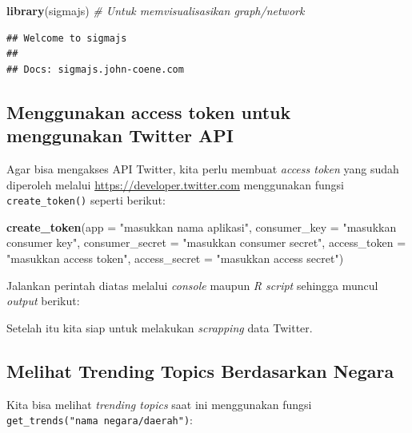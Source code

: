 \documentclass[]{tufte-handout}
\newenvironment{Shaded}{}{}
\newcommand{\KeywordTok}[1]{\textcolor[rgb]{0.00,0.44,0.13}{\textbf{#1}}}
\newcommand{\DataTypeTok}[1]{\textcolor[rgb]{0.56,0.13,0.00}{#1}}
\newcommand{\StringTok}[1]{\textcolor[rgb]{0.25,0.44,0.63}{#1}}
\newcommand{\CommentTok}[1]{\textcolor[rgb]{0.38,0.63,0.69}{\textit{#1}}}
\newcommand{\NormalTok}[1]{#1}
\begin{document}
\begin{Shaded}
\begin{Highlighting}[]
\KeywordTok{library}\NormalTok{(sigmajs) }\CommentTok{# Untuk memvisualisasikan graph/network}
\end{Highlighting}
\end{Shaded}

\begin{verbatim}
## Welcome to sigmajs
## 
## Docs: sigmajs.john-coene.com
\end{verbatim}

\subsection{Menggunakan access token untuk menggunakan Twitter
API}\label{menggunakan-access-token-untuk-menggunakan-twitter-api}

Agar bisa mengakses API Twitter, kita perlu membuat \emph{access token}
yang sudah diperoleh melalui \url{https://developer.twitter.com}
menggunakan fungsi \texttt{create\_token()} seperti berikut:

\begin{Shaded}
\begin{Highlighting}[]
\KeywordTok{create_token}\NormalTok{(}\DataTypeTok{app =} \StringTok{"masukkan nama aplikasi"}\NormalTok{,}
             \DataTypeTok{consumer_key =} \StringTok{"masukkan consumer key"}\NormalTok{,}
             \DataTypeTok{consumer_secret =} \StringTok{"masukkan consumer secret"}\NormalTok{,}
             \DataTypeTok{access_token =} \StringTok{"masukkan access token"}\NormalTok{,}
             \DataTypeTok{access_secret =} \StringTok{"masukkan access secret"}\NormalTok{)}
\end{Highlighting}
\end{Shaded}

Jalankan perintah diatas melalui \emph{console} maupun \emph{R script}
sehingga muncul \emph{output} berikut:

Setelah itu kita siap untuk melakukan \emph{scrapping} data Twitter.

\subsection{Melihat Trending Topics Berdasarkan
Negara}\label{melihat-trending-topics-berdasarkan-negara}

Kita bisa melihat \emph{trending topics} saat ini menggunakan fungsi
\texttt{get\_trends("nama\ negara/daerah")}:
\end{document}
